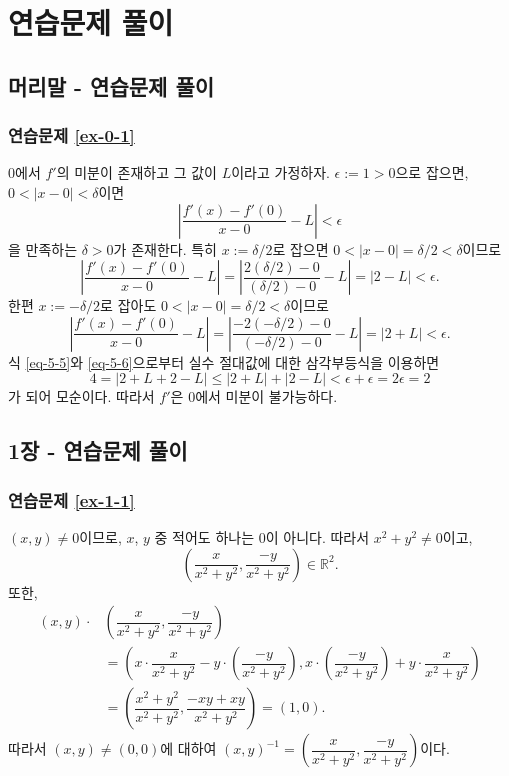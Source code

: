 
\chapter{연습문제 풀이}


\section*{머리말 - 연습문제 풀이}

\subsection*{연습문제 \ref{ex-0-1}}

$0$에서 $f'$의 미분이 존재하고 그 값이 $L$이라고 가정하자.
$\epsilon:=1>0$으로 잡으면, $0<|x-0|<\delta$이면
\[
\left| \dfrac{f'(x) - f'(0)}{x-0} - L\right| <\epsilon
\]
을 만족하는 $\delta>0$가 존재한다.
특히 $x:=\delta/2$로 잡으면
$0<|x-0| = \delta/2 < \delta$이므로
\begin{equation} \label{eq-5-5}
\left| \dfrac{f'(x) - f'(0)}{x-0} - L\right|
= \left| \dfrac{2(\delta/2) - 0}{(\delta/2)-0} - L\right| 
= |2-L| < \epsilon.
\end{equation}
한편 $x:=-\delta/2$로 잡아도
$0<|x-0| = \delta/2 < \delta$이므로
\begin{equation} \label{eq-5-6}
\left| \dfrac{f'(x) - f'(0)}{x-0} - L\right|
= \left| \dfrac{-2(-\delta/2) - 0}{(-\delta/2)-0} - L\right| 
= |2+L| < \epsilon.
\end{equation}
식 \eqref{eq-5-5}와 \eqref{eq-5-6}으로부터
실수 절대값에 대한 삼각부등식을  이용하면
\[
4 = |2+L+2-L| \le |2+L| + |2-L|
<\epsilon + \epsilon = 2\epsilon = 2
\]
가 되어 모순이다.
따라서 $f'$은 $0$에서 미분이 불가능하다.

\section*{1장 - 연습문제 풀이}

\subsection*{연습문제 \ref{ex-1-1}}

$(x,y) \ne 0$이므로, 
$x$, $y$ 중 적어도 하나는 $0$이 아니다.
따라서 $x^2+y^2\ne 0$이고,
\[
\left( \dfrac x{x^2+y^2}, \dfrac{-y}{x^2+y^2} \right) \in \mathbb R^2.
\]
또한,
\begin{align*}
(x,y) \cdot & \left( \dfrac x{x^2+y^2}, \dfrac{-y}{x^2+y^2} \right) \\
&=\left( x\cdot \dfrac x{x^2+y^2} - y\cdot \left( \dfrac{-y}{x^2+y^2} \right),
x\cdot \left(\dfrac{-y}{x^2+y^2}\right) + y\cdot  \dfrac{x}{x^2+y^2} \right) \\
&= \left( \dfrac{x^2+y^2}{x^2+y^2}, \dfrac{-xy + xy}{x^2+y^2} \right) = (1,0).
\end{align*}
따라서 $(x,y) \ne(0,0)$에 대하여
$
(x,y)^{-1} = \left(\dfrac x{x^2+y^2}, \dfrac{-y}{x^2+y^2} \right)
$이다.

